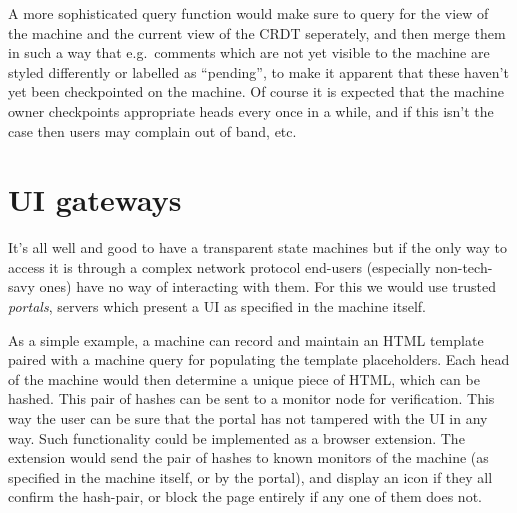 \documentclass[a4paper, oneside, 10pt]{amsart}
\begin{document}
A more sophisticated query function would make sure to query for the view of the
machine and the current view of the CRDT seperately, and then merge them in such
a way that e.g.~comments which are not yet visible to the machine are styled
differently or labelled as ``pending'', to make it apparent that these haven't
yet been checkpointed on the machine. Of course it is expected that the machine
owner checkpoints appropriate heads every once in a while, and if this isn't the
case then users may complain out of band, etc.

\section{UI gateways}

It's all well and good to have a transparent state machines but if the only way
to access it is through a complex network protocol end-users (especially
non-tech-savy ones) have no way of interacting with them. For this we would use
trusted \emph{portals}, servers which present a UI as specified in the machine
itself.

As a simple example, a machine can record and maintain an HTML template paired
with a machine query for populating the template placeholders. Each head of the
machine would then determine a unique piece of HTML, which can be hashed. This
pair of hashes can be sent to a monitor node for verification. This way the user
can be sure that the portal has not tampered with the UI in any way. Such
functionality could be implemented as a browser extension. The extension would
send the pair of hashes to known monitors of the machine (as specified in the
machine itself, or by the portal), and display an icon if they all confirm the
hash-pair, or block the page entirely if any one of them does not.
\end{document}
